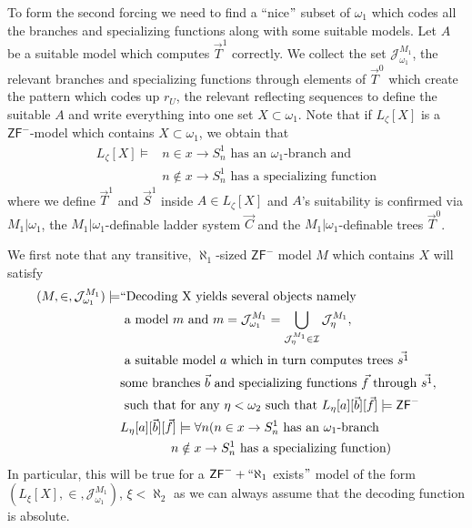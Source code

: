 \documentclass[a4paper,11pt]{article}
\newcommand{\ZFP}{\mathsf{ZF}^-}
\begin{document}
To form the second forcing we need to find a ``nice$"$ subset of $\omega_1$ which codes all the branches and specializing functions along with some suitable models.
Let $A$ be a suitable model which computes $\vec{T}^1$ correctly.
We collect the set $\mathcal{J}^{M_1}_{\omega_1}$, the relevant branches and specializing functions through elements of $\vec{T}^0$ which create the pattern which codes up $r_U$, the relevant reflecting sequences to define the suitable $A$ and write everything into one set $X \subset \omega_1$. 
Note that if $L_{\zeta}[X]$ is a $\ZFP$-model which contains $X \subset \omega_1$, we obtain that
\begin{align*}
L_{\zeta} [X] \models &n \in x \rightarrow S^1_{n} \text{ has an $\omega_1$-branch and } \\& 
n \notin x \rightarrow S^1_{n}  \text{ has a specializing function}
\end{align*}
where we define $\vec{T}^1$ and $\vec{S}^1$ inside $A \in L_{\zeta} [X]$ and $A$'s suitability is confirmed via $M_1 | \omega_1$, the $M_1 | \omega_1$-definable ladder system $\vec{C}$ and the $M_1 | \omega_1$-definable trees $\vec{T}^0$.

We first note that any transitive, $\aleph_1$-sized $\ZFP$ model $M$ which contains $X$ will satisfy
\begin{align*}
(M, \in,  \mathcal{J}^{M_1}_{\omega_1}) \models &``\text{Decoding X yields several objects namely} \\& \text{ a model $m$ and $m=\mathcal{J}^{ M_1}_{\omega_1}$}=\bigcup_{\mathcal{J}^{M_1}_{\eta} \in \mathcal{I}} \mathcal{J}^{M_1}_{\eta},  \\ & \text{ a suitable model $a$ which in turn computes trees $\vec{s^1}$ } \\& \text{some branches $\vec{b}$ and specializing functions $\vec{f}$ through $\vec{s^1}$},\\& \text{ such that for any $\eta< \omega_2$ such that $L_{\eta}[a][\vec{b}] [\vec{f}] \models \ZFP$} 	 \\&
			L_{\eta}[a][\vec{b}] [\vec{f}] \models  \forall n  ( n \in x \rightarrow S^1_{n}  \text{ has an $\omega_1$-branch}  \\&
		\qquad \qquad  	n \notin x \rightarrow S^1_{n}  \text{ has a specializing function})
			\end{align*}
In particular, this will be true for a $\ZFP +`` \aleph_1$ exists$"$ model of the form $(L_{\xi}[X],\in, \mathcal{J}^{M_1}_{\omega_1})$, $\xi < \aleph_2$ as we can always assume that the decoding function is absolute. 
\end{document}
